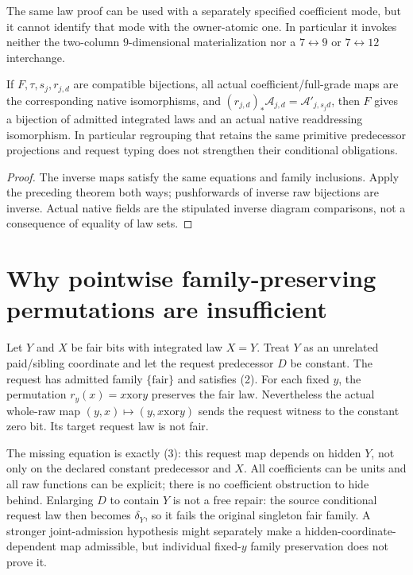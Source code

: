 \documentclass[11pt]{article}
\begin{document}
The same law proof can be used with a separately specified coefficient mode, but it cannot identify that mode with the owner-atomic one. In particular it invokes neither the two-column $9$-dimensional materialization nor a $7\leftrightarrow9$ or $7\leftrightarrow12$ interchange.

\begin{proposition}
If $F,\tau,s_j,r_{j,d}$ are compatible bijections, all actual coefficient/full-grade maps are the corresponding native isomorphisms, and $(r_{j,d})_*\mathcal A_{j,d}=\mathcal A'_{j,s_jd}$, then $F$ gives a bijection of admitted integrated laws and an actual native readdressing isomorphism. In particular regrouping that retains the same primitive predecessor projections and request typing does not strengthen their conditional obligations.
\end{proposition}
\begin{proof}
The inverse maps satisfy the same equations and family inclusions. Apply the preceding theorem both ways; pushforwards of inverse raw bijections are inverse. Actual native fields are the stipulated inverse diagram comparisons, not a consequence of equality of law sets.\end{proof}

\section{Why pointwise family-preserving permutations are insufficient}
Let $Y$ and $X$ be fair bits with integrated law $X=Y$. Treat $Y$ as an unrelated paid/sibling coordinate and let the request predecessor $D$ be constant. The request has admitted family $\{\mathrm{fair}\}$ and satisfies (2). For each fixed $y$, the permutation $r_y(x)=x\mathbin{\mathrm{xor}}y$ preserves the fair law. Nevertheless the actual whole-raw map $(y,x)\mapsto(y,x\mathbin{\mathrm{xor}}y)$ sends the request witness to the constant zero bit. Its target request law is not fair.

The missing equation is exactly (3): this request map depends on hidden $Y$, not only on the declared constant predecessor and $X$. All coefficients can be units and all raw functions can be explicit; there is no coefficient obstruction to hide behind. Enlarging $D$ to contain $Y$ is not a free repair: the source conditional request law then becomes $\delta_Y$, so it fails the original singleton fair family. A stronger joint-admission hypothesis might separately make a hidden-coordinate-dependent map admissible, but individual fixed-$y$ family preservation does not prove it.
\end{document}
